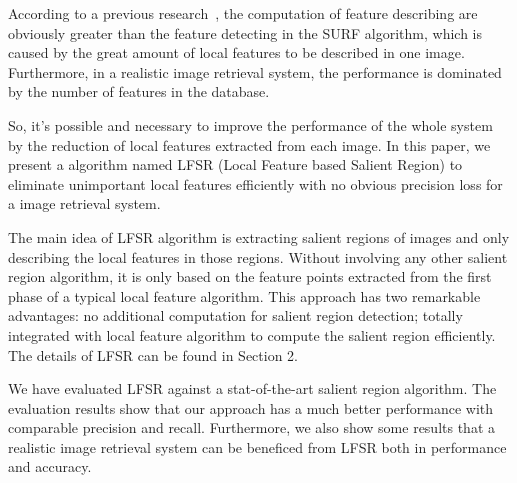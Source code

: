 According to a previous research~\cite{Fang2011ispass}, the computation of feature describing are obviously greater than the feature detecting in the SURF algorithm, which is caused by the great amount of local features to be described in one image. Furthermore, in a realistic image retrieval system, the performance is dominated by the number of features in the database.

So, it's possible and necessary to improve the performance of the whole system by the reduction of local features extracted from each image. In this paper, we present a algorithm named LFSR (Local Feature based Salient Region) to eliminate unimportant local features efficiently with no obvious precision loss for a image retrieval system.

The main idea of LFSR algorithm is extracting salient regions of images and only describing the local features in those regions. Without involving any other salient region algorithm, it is only based on the feature points extracted from the first phase of a typical local feature algorithm. This approach has two remarkable advantages: no additional computation for salient region detection; totally integrated with local feature algorithm to compute the salient region efficiently. The details of LFSR can be found in Section 2. 

We have evaluated LFSR against a stat-of-the-art salient region algorithm. The evaluation results show that our approach has a much better performance with comparable precision and recall. Furthermore, we also show some results that a realistic image retrieval system can be beneficed from LFSR both in performance and accuracy. 